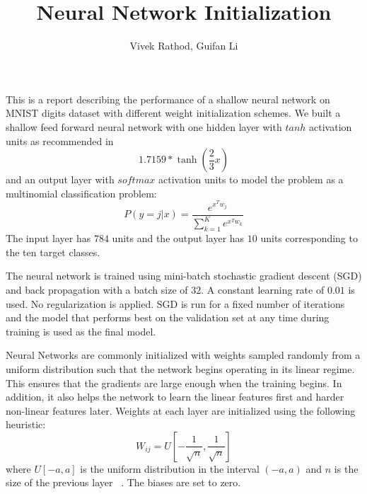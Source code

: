\documentclass[Proceedings]{ascelike}
\begin{document}
%
\title{Neural Network Initialization}
%
\author{ Vivek Rathod, Guifan Li }
%
\maketitle
%

 This is a report describing the performance of a shallow
neural network on MNIST digits dataset with different weight initialization
schemes.
 \label{sec:network_struct} We built a
shallow feed forward neural network with one hidden layer with $tanh$
activation units as recommended in \cite{lecun2012efficient}
\[1.7159*\tanh\left(\frac{2}{3}x\right)\] and an output layer with $softmax$
activation units to model the problem as a multinomial classification
problem:\[P(y=j|x)=\frac{e^{x^{T}w_j}}{\sum_{k=1}^Ke^{x^{T}w_k}}\] The input
layer has $784$ units and the output layer has $10$ units corresponding to the
ten target classes.

 \label{sec:train_method} The neural network is
trained using mini-batch stochastic gradient descent (SGD) and back propagation
with a batch size of $32$. A constant learning rate of $0.01$ is used. No
regularization is applied. SGD is run for a fixed number of iterations and the
model that performs best on the validation set at any time during training is
used as the final model. 

 \label{sec:weight_init} Neural Networks are
commonly initialized with weights sampled randomly from a uniform distribution
such that the network begins operating in its linear regime. This ensures that
the gradients are large enough when the training begins. In addition, it also
helps the network to learn the linear features first and harder non-linear
features later. Weights at each layer are initialized using the following
heuristic: \[W_{ij} = U\left[-\frac{1}{\sqrt{n}},\frac{1}{\sqrt{n}}\right]\]
where $U[-a, a]$ is the uniform distribution in the interval $(-a, a)$ and $n$
is the size of the previous layer ~\cite{erhan2009difficulty}. The biases are
set to zero.
\end{document}
